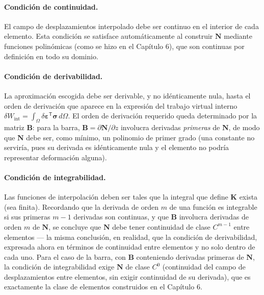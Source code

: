 \paragraph{Condición de continuidad.} El campo de desplazamientos interpolado debe ser continuo en el interior de cada elemento. Esta condición se satisface automáticamente al construir $\bm N$ mediante funciones polinómicas (como se hizo en el Capítulo 6), que son continuas por definición en todo su dominio.

\paragraph{Condición de derivabilidad.} La aproximación escogida debe ser derivable, y no idénticamente nula, hasta el orden de derivación que aparece en la expresión del trabajo virtual interno $\delta W_{\text{int}}=\int_\Omega \delta\bm\varepsilon^{\mathsf T}\bm\sigma\,d\Omega$. El orden de derivación requerido queda determinado por la matriz $\bm B$: para la barra, $\bm B = \partial \bm N/\partial z$ involucra derivadas \emph{primeras} de $\bm N$, de modo que $\bm N$ debe ser, como mínimo, un polinomio de primer grado (una constante no serviría, pues su derivada es idénticamente nula y el elemento no podría representar deformación alguna).

\paragraph{Condición de integrabilidad.} Las funciones de interpolación deben ser tales que la integral que define $\bm K$ exista (sea finita). Recordando que la derivada de orden $m$ de una función es integrable si sus primeras $m-1$ derivadas son continuas, y que $\bm B$ involucra derivadas de orden $m$ de $\bm N$, se concluye que $\bm N$ debe tener continuidad de clase $C^{m-1}$ entre elementos --- la misma conclusión, en realidad, que la condición de derivabilidad, expresada ahora en términos de continuidad entre elementos y no solo dentro de cada uno. Para el caso de la barra, con $\bm B$ conteniendo derivadas primeras de $\bm N$, la condición de integrabilidad exige $\bm N$ de clase $C^0$ (continuidad del campo de desplazamientos entre elementos, sin exigir continuidad de su derivada), que es exactamente la clase de elementos construidos en el Capítulo 6.

